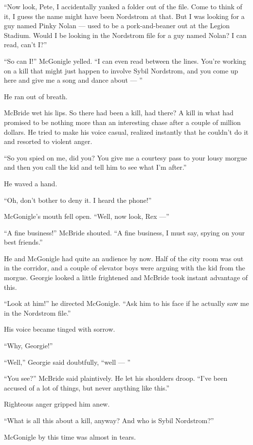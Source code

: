 \documentclass{novel}
\begin{document}
“Now look, Pete, I accidentally yanked a folder out of the file. Come to think of it, I guess the name might have been Nordstrom at that. But I was looking for a guy named Pinky Nolan — used to be a pork-and-beaner out at the Legion Stadium. Would I be looking in the Nordstrom file for a guy named Nolan? I can read, can’t I?”

“So can I!” McGonigle yelled. “I can even read between the lines. You’re working on a kill that might just happen to involve
Sybil Nordstrom, and you come up here and give me a song and dance about — ”

He ran out of breath.

McBride wet his lips. So there had been a kill, had there? A kill in what had promised to be nothing more than an interesting chase after a couple of million dollars. He tried to make his voice casual, realized instantly that he couldn’t do it and resorted to violent anger.

“So you spied on me, did you? You give me a courtesy pass to your lousy morgue and then you call the kid and tell him to see what I’m after.”

He waved a hand.

“Oh, don’t bother to deny it. I heard the phone!”

McGonigle’s mouth fell open. “Well, now look, Rex —”

“A fine business!” McBride shouted. “A fine business, I must say, spying on your best friends.”

He and McGonigle had quite an audience by now. Half of the city room was out in the corridor, and a couple of elevator boys were arguing with the kid from the morgue. Georgie looked a little frightened and McBride took instant advantage of this.

“Look at him!” he directed McGonigle. “Ask him to his face if he actually saw me in the Nordstrom file.”

His voice became tinged with sorrow.

“Why, Georgie!”

“Well,” Georgie said doubtfully, “well — ”

“You see?” McBride said plaintively. He let his shoulders droop. “I’ve been accused of a lot of things, but never anything like this.”

Righteous anger gripped him anew.

“What is all this about a kill, anyway? And who is Sybil Nordstrom?”

McGonigle by this time was almost in tears.
\end{document}
